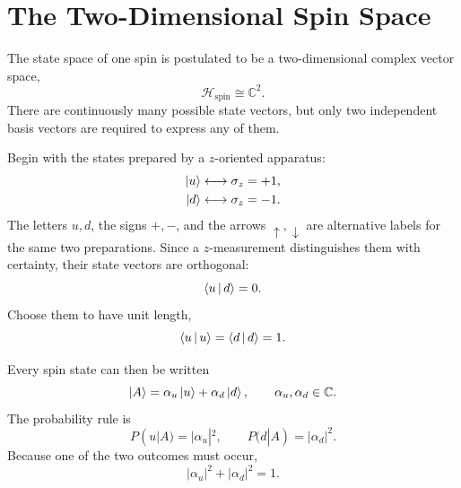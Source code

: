 \begin{classroomqa}
\end{classroomqa}

\section{The Two-Dimensional Spin Space}

The state space of one spin is postulated to be a two-dimensional complex vector space,
\begin{equation}
\mathcal H_{\mathrm{spin}}\cong\mathbb C^2.
\end{equation}
There are continuously many possible state vectors, but only two independent basis vectors are required to express any of them.

Begin with the states prepared by a \(z\)-oriented apparatus:
\begin{align}
\left\lvert u\right\rangle&\longleftrightarrow \sigma_z=+1,\\
\left\lvert d\right\rangle&\longleftrightarrow \sigma_z=-1.
\end{align}
The letters \(u,d\), the signs \(+,-\), and the arrows \(\uparrow,\downarrow\) are alternative labels for the same two preparations. Since a \(z\)-measurement distinguishes them with certainty, their state vectors are orthogonal:
\begin{equation}
\left\langle u\,\middle|\,d\right\rangle=0.
\end{equation}
Choose them to have unit length,
\[
\left\langle u\,\middle|\,u\right\rangle=\left\langle d\,\middle|\,d\right\rangle=1.
\]

Every spin state can then be written
\begin{equation}
\left\lvert A\right\rangle=\alpha_u\left\lvert u\right\rangle+\alpha_d\left\lvert d\right\rangle,
\qquad \alpha_u,\alpha_d\in\mathbb C.
\label{eq:general-spin-state}
\end{equation}
The probability rule is
\begin{equation}
P(u|A)=|\alpha_u|^2,\qquad
P(d|A)=|\alpha_d|^2.
\label{eq:born-z}
\end{equation}
Because one of the two outcomes must occur,
\begin{equation}
|\alpha_u|^2+|\alpha_d|^2=1.
\label{eq:normalization}
\end{equation}

